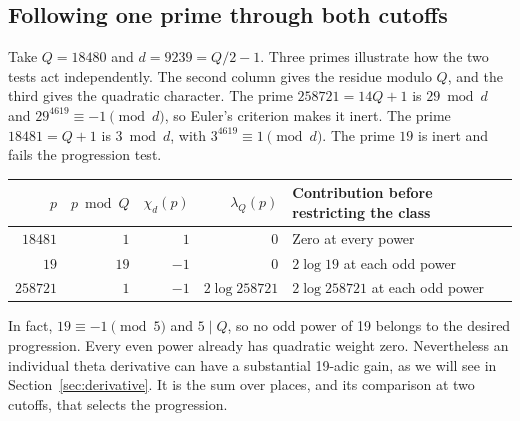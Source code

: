 \documentclass[11pt,letterpaper]{article}
\begin{document}
\subsection{Following one prime through both cutoffs}\label{sec:oneprime}
Take \(Q=18480\) and \(d=9239=Q/2-1\). Three primes illustrate how the two tests act independently. The second column gives the residue modulo \(Q\), and the third gives the quadratic character. The prime \(258721=14Q+1\) is \(29\bmod d\) and \(29^{4619}\equiv-1\pmod d\), so Euler's criterion makes it inert. The prime \(18481=Q+1\) is \(3\bmod d\), with \(3^{4619}\equiv1\pmod d\). The prime \(19\) is inert and fails the progression test.
\begin{center}
\begin{tabular}{@{}rrrrl@{}}
\toprule
\(p\)&\(p\bmod Q\)&\(\chi_d(p)\)&\(\lambda_Q(p)\)&Contribution before restricting the class\\
\midrule
\(18481\)&\(1\)&\(1\)&\(0\)&Zero at every power\\
\(19\)&\(19\)&\(-1\)&\(0\)&\(2\log19\) at each odd power\\
\(258721\)&\(1\)&\(-1\)&\(2\log258721\)&\(2\log258721\) at each odd power\\
\bottomrule
\end{tabular}
\end{center}
In fact, \(19\equiv-1\pmod5\) and \(5\mid Q\), so no odd power of 19 belongs to the desired progression. Every even power already has quadratic weight zero. Nevertheless an individual theta derivative can have a substantial 19-adic gain, as we will see in Section~\ref{sec:derivative}. It is the sum over places, and its comparison at two cutoffs, that selects the progression.
\end{document}
